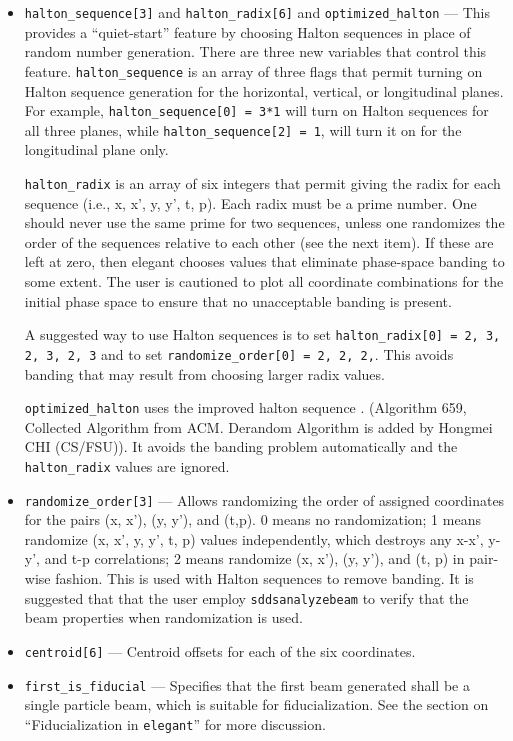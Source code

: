 \documentclass[11pt]{article}
\begin{document}
\begin{itemize}
\item \verb|halton_sequence[3]| and \verb|halton_radix[6]| and \verb|optimized_halton|
--- This provides a ``quiet-start'' feature by choosing Halton sequences in
place of random number generation.  There are three new variables that
control this feature.  \verb|halton_sequence| is an array of three
flags that permit turning on Halton sequence generation for the
horizontal, vertical, or longitudinal planes.  For example,
\verb|halton_sequence[0] = 3*1| will turn on Halton sequences for all
three planes, while \verb|halton_sequence[2] = 1|, will turn it on for
the longitudinal plane only.

\verb|halton_radix| is an array of six integers that permit giving the
radix for each sequence (i.e., x, x', y, y', t, p).  Each radix must
be a prime number.  One should never use the same prime for two
sequences, unless one randomizes the order of the sequences relative to
each other (see the next item).  If these are left at zero, then
elegant chooses values that eliminate phase-space banding to some
extent.  The user is cautioned to plot all coordinate combinations for
the initial phase space to ensure that no unacceptable banding is
present.

A suggested way to use Halton sequences is to set
\verb|halton_radix[0] = 2, 3, 2, 3, 2, 3| and
to set 
\verb|randomize_order[0] = 2, 2, 2,|.  This avoids banding that may
result from choosing larger radix values.

\verb|optimized_halton| uses the improved halton sequence \cite{Chi2005}.
(Algorithm 659, Collected Algorithm from ACM. Derandom Algorithm is added
by Hongmei CHI (CS/FSU)). It avoids the banding problem automatically and
the \verb|halton_radix| values are ignored.

\item \verb|randomize_order[3]| --- Allows randomizing the order of
assigned coordinates for the pairs (x, x'), (y, y'), and (t,p).  0
means no randomization; 1 means randomize (x, x', y, y', t, p) values
independently, which destroys any x-x', y-y', and t-p correlations; 2
means randomize (x, x'), (y, y'), and (t, p) in pair-wise fashion.
This is used with Halton sequences to remove banding.  It is suggested
that that the user employ \verb|sddsanalyzebeam| to verify that the
beam properties when randomization is used.

\item \verb|centroid[6]| --- Centroid offsets for each of the six coordinates.

\item \verb|first_is_fiducial| --- Specifies that the first beam
generated shall be a single particle beam, which is suitable for
fiducialization.  See the section on ``Fiducialization in
\verb|elegant|'' for more discussion.


\end{itemize}
\end{document}
